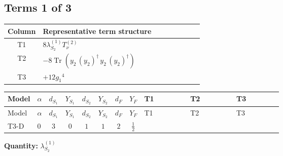 \documentclass[8pt]{article}
\begin{document}
\begin{landscape}
\subsection*{Terms 1 of 3}
\begin{center}
\begin{tabular}{@{}c >{\raggedright\arraybackslash}p{0.82\linewidth}@{}}
\toprule
Column & Representative term structure \\
\midrule
T1 & \(\displaystyle 8 {\lambda_{S_2}^{(1)}} T_{\nu}^{(2)}\) \\
\midrule
T2 & \(\displaystyle -8 \operatorname{Tr}\!\left({y_2}\,\left({y_2}\right)^{\dagger}\,{y_2}\,\left({y_2}\right)^{\dagger}\right)\) \\
\midrule
T3 & \(\displaystyle +12 {g_1}^4\) \\
\midrule
\bottomrule
\end{tabular}
\end{center}
\smallskip
\tiny
\begin{longtable}{@{}llcccccc >{\raggedright\arraybackslash}p{0.21\linewidth} >{\raggedright\arraybackslash}p{0.21\linewidth} >{\raggedright\arraybackslash}p{0.21\linewidth}@{}}
\toprule
Model & $\alpha$ & $d_{S_1}$ & $Y_{S_1}$ & $d_{S_2}$ & $Y_{S_2}$ & $d_F$ & $Y_F$ & T1 & T2 & T3 \\
\midrule
\endfirsthead
\toprule
Model & $\alpha$ & $d_{S_1}$ & $Y_{S_1}$ & $d_{S_2}$ & $Y_{S_2}$ & $d_F$ & $Y_F$ & T1 & T2 & T3 \\
\midrule
\endhead
T3-D & $0$ & $3$ & $0$ & $1$ & $1$ & $2$ & $\frac{1}{2}$ & \scriptsize\adjustbox{max width=\linewidth}{$\begin{gathered} 8 {\lambda_{S_2}^{(1)}} T_{\nu}^{(2)}\end{gathered}$} & \scriptsize\adjustbox{max width=\linewidth}{$\begin{gathered} -8 \operatorname{Tr}\!\left({y_2}\,\left({y_2}\right)^{\dagger}\,{y_2}\,\left({y_2}\right)^{\dagger}\right)\end{gathered}$} & \scriptsize\adjustbox{max width=\linewidth}{$\begin{gathered} +12 {g_1}^4\end{gathered}$} \\
\midrule
\bottomrule
\end{longtable}
\clearpage
\noindent\textbf{Quantity: }$\lambda_{S_2}^{(1)}$\par\smallskip

\end{landscape}
\end{document}
